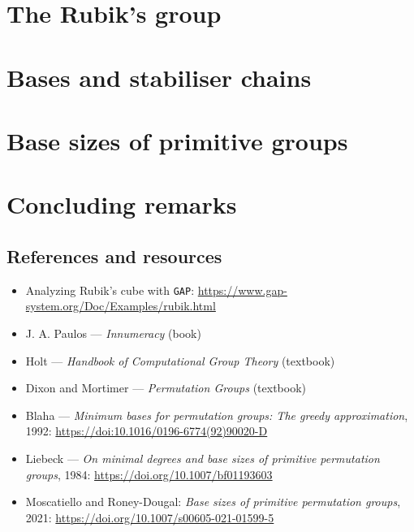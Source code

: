 \documentclass{beamer}
\begin{document}


\section{The Rubik's group}



\section{Bases and stabiliser chains}



\section{Base sizes of primitive groups}



\section{Concluding remarks}

\subsection{References and resources}

\begin{slide}
    \small
    \begin{itemize}
        \item Analyzing Rubik's cube with \texttt{GAP}: \url{https://www.gap-system.org/Doc/Examples/rubik.html}
        \item J. A. Paulos --- \textit{Innumeracy} (book)
        \item Holt --- \textit{Handbook of Computational Group Theory} (textbook)
        \item Dixon and Mortimer --- \textit{Permutation Groups} (textbook)
        \item Blaha --- \textit{Minimum bases for permutation groups: The greedy approximation}, 1992: \url{https://doi:10.1016/0196-6774(92)90020-D}
        \item Liebeck --- \textit{On minimal degrees and base sizes of primitive permutation groups}, 1984: \url{https://doi.org/10.1007/bf01193603}
        \item Moscatiello and Roney-Dougal: \textit{Base sizes of primitive permutation groups}, 2021: \url{https://doi.org/10.1007/s00605-021-01599-5}
    \end{itemize}
\end{slide}


\end{document}
